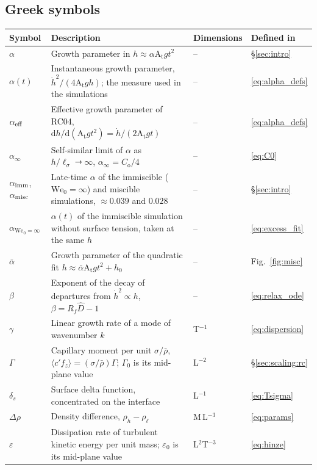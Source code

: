 \documentclass[11pt]{article}
\numberwithin{equation}{section}
\newcommand{\avg}[1]{\langle #1\rangle}
\newcommand{\At}{\mathrm{A_t}}
\newcommand{\We}{\mathrm{We}_0}
\newcommand{\ls}{\ell_\sigma}
\newcommand{\hd}{\dot h}
\begin{document}
\subsection*{Greek symbols}
\begin{longtable}{@{}P{0.13}P{0.53}P{0.13}P{0.13}@{}}
\toprule
Symbol & Description & Dimensions & Defined in\\
\midrule
\endhead
\bottomrule
\endfoot
$\alpha$ & Growth parameter in $h \approx \alpha \At g t^2$ & -- & \S\ref{sec:intro}\\
$\alpha(t)$ & Instantaneous growth parameter, $\hd^2/(4 \At g h)$; the measure used in the simulations & -- & \eqref{eq:alpha_defs}\\
$\alpha_{\rm eff}$ & Effective growth parameter of RC04, $\mathrm d h/\mathrm d(\At g t^2) = \hd/(2 \At g t)$ & -- & \eqref{eq:alpha_defs}\\
$\alpha_\infty$ & Self-similar limit of $\alpha$ as $h/\ls \rightarrowtriangle \infty$, $\alpha_\infty = C_\mathrm{o}/4$ & -- & \eqref{eq:C0}\\
$\alpha_{\rm imm}$, $\alpha_{\rm misc}$ & Late-time $\alpha$ of the immiscible ($\We = \infty$) and miscible simulations, $\approx 0.039$ and $0.028$ & -- & \S\ref{sec:intro}\\
$\alpha_{\We = \infty}$ & $\alpha(t)$ of the immiscible simulation without surface tension, taken at the same $h$ & -- & \eqref{eq:excess_fit}\\
$\bar\alpha$ & Growth parameter of the quadratic fit $h \approx \bar\alpha \At g t^2 + h_0$ & -- & Fig.~\ref{fig:misc}\\
$\beta$ & Exponent of the decay of departures from $\hd^2 \propto h$, $\beta = R_f \hat D - 1$ & -- & \eqref{eq:relax_ode}\\
$\gamma$ & Linear growth rate of a mode of wavenumber $k$ & T$^{-1}$ & \eqref{eq:dispersion}\\
$\Gamma$ & Capillary moment per unit $\sigma/\bar\rho$, $\avg{c' f_z} = (\sigma/\bar\rho) \Gamma$; $\Gamma_0$ is its mid-plane value & L$^{-2}$ & \S\ref{sec:scaling:rc}\\
$\delta_s$ & Surface delta function, concentrated on the interface & L$^{-1}$ & \eqref{eq:Tsigma}\\
$\Delta \rho$ & Density difference, $\rho_h - \rho_\ell$ & M\,L$^{-3}$ & \eqref{eq:params}\\
$\varepsilon$ & Dissipation rate of turbulent kinetic energy per unit mass; $\varepsilon_0$ is its mid-plane value & L$^2$T$^{-3}$ & \eqref{eq:hinze}\\

\end{longtable}
\end{document}
